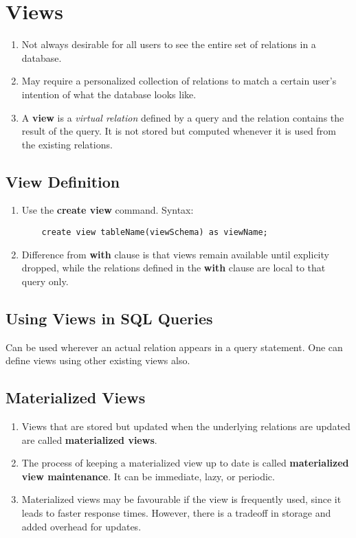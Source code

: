 \documentclass[journal,12pt,twocolumn]{IEEEtran}
\begin{document}
\section{Views}
\begin{enumerate}
    \item Not always desirable for all users to see the entire set of relations 
    in a database.
    \item May require a personalized collection of relations to match a certain 
    user's intention of what the database looks like.
    \item A \textbf{view} is a \textit{virtual relation} defined by a query and 
    the relation contains the result of the query. It is not stored but computed 
    whenever it is used from the existing relations.
\end{enumerate}

\subsection{View Definition}
\begin{enumerate}
    \item Use the \textbf{create view} command. Syntax:
    \begin{lstlisting}
    create view tableName(viewSchema) as viewName;
    \end{lstlisting}
    \item Difference from \textbf{with} clause is that views remain available 
    until explicity dropped, while the relations defined in the \textbf{with} 
    clause are local to that query only.
\end{enumerate}

\subsection{Using Views in SQL Queries}

Can be used wherever an actual relation appears in a query statement. One can 
define views using other existing views also.

\subsection{Materialized Views}
\begin{enumerate}
    \item Views that are stored but updated when the underlying relations are 
    updated are called \textbf{materialized views}.
    \item The process of keeping a materialized view up to date is called 
    \textbf{materialized view maintenance}. It can be immediate, lazy, or 
    periodic.
    \item Materialized views may be favourable if the view is frequently used,
    since it leads to faster response times. However, there is a tradeoff in 
    storage and added overhead for updates.
\end{enumerate}
  
\end{document}
